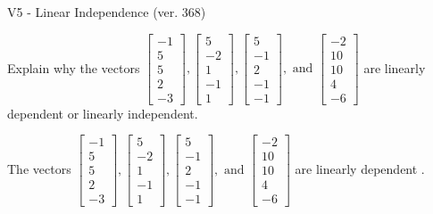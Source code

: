 \begin{exercise}
  \begin{exerciseTitle}V5 - Linear Independence (ver. 368)\end{exerciseTitle}
  \begin{exerciseStatement}
    Explain why the vectors \(\left[\begin{array}{r}
-1 \\
5 \\
5 \\
2 \\
-3
\end{array}\right] , \left[\begin{array}{r}
5 \\
-2 \\
1 \\
-1 \\
1
\end{array}\right] , \left[\begin{array}{r}
5 \\
-1 \\
2 \\
-1 \\
-1
\end{array}\right] , \text{ and } \left[\begin{array}{r}
-2 \\
10 \\
10 \\
4 \\
-6
\end{array}\right]\) are linearly dependent or linearly independent.	


  \end{exerciseStatement}
  \begin{exerciseAnswer}
   The vectors \(\left[\begin{array}{r}
-1 \\
5 \\
5 \\
2 \\
-3
\end{array}\right] , \left[\begin{array}{r}
5 \\
-2 \\
1 \\
-1 \\
1
\end{array}\right] , \left[\begin{array}{r}
5 \\
-1 \\
2 \\
-1 \\
-1
\end{array}\right] , \text{ and } \left[\begin{array}{r}
-2 \\
10 \\
10 \\
4 \\
-6
\end{array}\right]\) are 
  	 linearly dependent  .
  


  \end{exerciseAnswer}
\end{exercise}